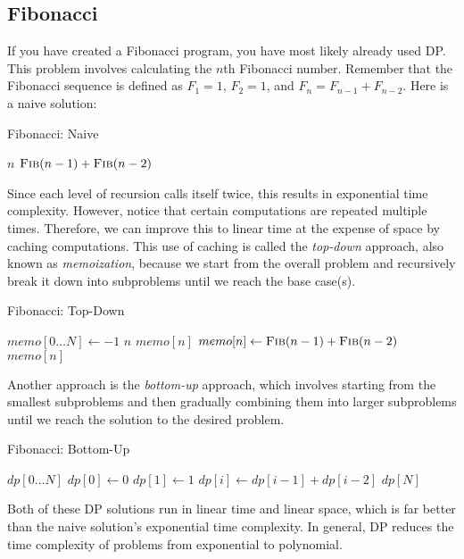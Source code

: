 \documentclass[11pt]{article}
\begin{document}
\subsection{Fibonacci}
If you have created a Fibonacci program, you have most likely already used DP. This problem involves calculating the $n$th Fibonacci number. Remember that the Fibonacci sequence is defined as $F_1 = 1$, $F_2 = 1$, and $F_n = F_{n-1} + F_{n-2}$. Here is a naive solution:
\begin{algorithm}[H]
\caption{Fibonacci: Naive}
\begin{algorithmic}
            \State \Return $n$
        \EndIf
        \State \Return $\Call{Fib}{n-1} + \Call{Fib}{n-2}$
    \EndFunction
\end{algorithmic}
\end{algorithm}
Since each level of recursion calls itself twice, this results in exponential time complexity. However, notice that certain computations are repeated multiple times. Therefore, we can improve this to linear time at the expense of space by caching computations. This use of caching is called the \textit{top-down} approach, also known as \textit{memoization}, because we start from the overall problem and recursively break it down into subproblems until we reach the base case(s).
\begin{algorithm}[H]
\caption{Fibonacci: Top-Down}
\begin{algorithmic}
    \State \Init $memo[0 \dots N] \gets -1$
            \State \Return $n$
        \EndIf
            \State \Return $memo[n]$
        \EndIf
        \State $memo[n] \gets \Call{Fib}{n-1} + \Call{Fib}{n-2}$
        \State \Return $memo[n]$
    \EndFunction
\end{algorithmic}
\end{algorithm}
Another approach is the \textit{bottom-up} approach, which involves starting from the smallest subproblems and then gradually combining them into larger subproblems until we reach the solution to the desired problem.
\begin{algorithm}[H]
\caption{Fibonacci: Bottom-Up}
\begin{algorithmic}
        \State \Init $dp[0 \dots N]$
        \State $dp[0] \gets 0$
        \State $dp[1] \gets 1$
            \State $dp[i] \gets dp[i - 1] + dp[i - 2]$
        \EndFor
        \State \Return $dp[N]$
    \EndFunction
\end{algorithmic}
\end{algorithm}
Both of these DP solutions run in linear time and linear space, which is far better than the naive solution's exponential time complexity. In general, DP reduces the time complexity of problems from exponential to polynomial. %
\end{document}
